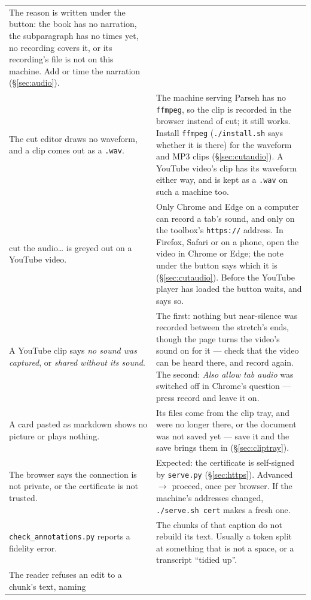 \documentclass[11pt,oneside]{report}
\newcommand{\file}[1]{\texttt{#1}}
\newcommand{\menu}[1]{\textsf{#1}}
\begin{document}
\begin{center}
\begin{longtable}{@{}p{}p{}@{}}
  The reason is written under the button: the book has no narration, the
  subparagraph has no times yet, no recording covers it, or its recording's
  file is not on this machine. Add or time the narration
  (\S\ref{sec:audio}). \\
\addlinespace
The cut editor draws no waveform, and a clip comes out as a \file{.wav}. &
  The machine serving Parseh has no \texttt{ffmpeg}, so the clip is recorded
  in the browser instead of cut; it still works. Install \texttt{ffmpeg}
  (\file{./install.sh} says whether it is there) for the waveform and MP3
  clips (\S\ref{sec:cutaudio}). A YouTube video's clip has its waveform
  either way, and is kept as a \file{.wav} on such a machine too. \\
\addlinespace
\menu{cut the audio\ldots} is greyed out on a YouTube video. &
  Only Chrome and Edge on a computer can record a tab's sound, and only on
  the toolbox's \texttt{https://} address. In Firefox, Safari or on a phone,
  open the video in Chrome or Edge; the note under the button says which it
  is (\S\ref{sec:cutaudio}). Before the YouTube player has loaded the
  button waits, and says so. \\
\addlinespace
A YouTube clip says \emph{no sound was captured}, or \emph{shared without
its sound}. &
  The first: nothing but near-silence was recorded between the stretch's
  ends, though the page turns the video's sound on for it --- check that
  the video can be heard there, and record again. The second: \emph{Also
  allow tab audio} was switched off in Chrome's question --- press
  \menu{record} and leave it on. \\
\addlinespace
A card pasted as markdown shows no picture or plays nothing. &
  Its files come from the clip tray, and were no longer there, or the
  document was not saved yet --- save it and the save brings them in
  (\S\ref{sec:cliptray}). \\
\addlinespace
The browser says the connection is not private, or the certificate is not
trusted. &
  Expected: the certificate is self-signed by \file{serve.py}
  (\S\ref{sec:https}).
  \menu{Advanced} $\rightarrow$ proceed, once per browser. If the machine's
  addresses changed, \file{./serve.sh cert} makes a fresh one. \\
\addlinespace
\file{check\_annotations.py} reports a fidelity error. &
  The chunks of that caption do not rebuild its text. Usually a token split
  at something that is not a space, or a transcript ``tidied up''. \\
\addlinespace
The reader refuses an edit to a chunk's text, naming

\end{longtable}
\end{center}
\end{document}
